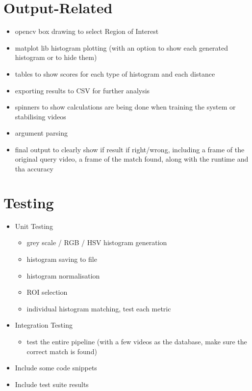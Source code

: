
\section{Output-Related}

\begin{itemize}
    \item opencv box drawing to select Region of Interest
    \item matplot lib histogram plotting (with an option to show each generated histogram or to hide them)
    \item tables to show scores for each type of histogram and each distance
    \item exporting results to CSV for further analysis
    \item spinners to show calculations are being done when training the system or stabilising videos 
    \item argument parsing
    \item final output to clearly show if result if right/wrong, including a frame of the original query video, a frame of the match found, along with the runtime and tha accuracy
\end{itemize}


\section{Testing}

\begin{itemize}
    \item Unit Testing
        \begin{itemize}
            \item grey scale / RGB / HSV histogram generation
            \item histogram saving to file
            \item histogram normalisation
            \item ROI selection
            \item individual histogram matching, test each metric
        \end{itemize}
    \item Integration Testing
        \begin{itemize}
            \item test the entire pipeline (with a few videos as the database, make sure the correct match is found)
        \end{itemize}
    \item Include some code snippets
    \item Include test suite results
\end{itemize}
